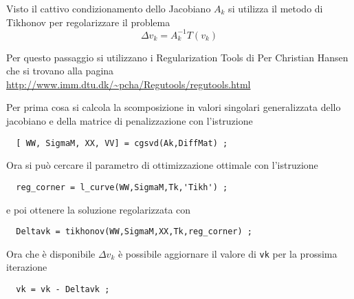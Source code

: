 \documentclass[a4paper,10pt]{article}
\theoremstyle{plain}
\theoremstyle{definition}
\theoremstyle{remark}
\begin{document}
Visto il cattivo condizionamento dello Jacobiano $A_k$ si utilizza il
metodo di Tikhonov per regolarizzare il problema 
\begin{equation*}
  \Delta v _k = A_k ^{-1} T(v_k)
\end{equation*}

Per questo passaggio si utilizzano i Regularization Tools di Per
Christian Hansen che si trovano alla pagina
\url{http://www.imm.dtu.dk/~pcha/Regutools/regutools.html} 

Per prima cosa si calcola la scomposizione in valori singolari
generalizzata dello jacobiano e della matrice di penalizzazione con
l'istruzione
\begin{lstlisting}
  [ WW, SigmaM, XX, VV] = cgsvd(Ak,DiffMat) ;
\end{lstlisting}

Ora si può cercare il parametro di ottimizzazione ottimale con
l'istruzione
\begin{lstlisting}
  reg_corner = l_curve(WW,SigmaM,Tk,'Tikh') ;
\end{lstlisting}
e poi ottenere la soluzione regolarizzata con
\begin{lstlisting}
  Deltavk = tikhonov(WW,SigmaM,XX,Tk,reg_corner) ;
\end{lstlisting}

Ora che è disponibile $\Delta v_k$ è possibile aggiornare il valore di
\lstinline{vk} per la prossima iterazione
\begin{lstlisting}
  vk = vk - Deltavk ;
\end{lstlisting}
\end{document}
